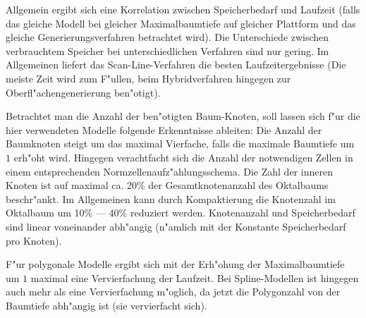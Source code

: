 Allgemein ergibt sich eine Korrelation zwischen Speicherbedarf und Laufzeit 
(falls das gleiche Modell bei gleicher Maximalbaumtiefe auf gleicher 
Plattform und das gleiche Generierungsverfahren betrachtet wird).
Die Unterschiede zwischen verbrauchtem Speicher bei unterschiedlichen 
Verfahren sind nur gering.
Im Allgemeinen liefert das Scan-Line-Verfahren die besten Laufzeitergebnisse 
(Die meiste Zeit wird zum F"ullen, beim Hybridverfahren hingegen zur 
Oberfl"achengenerierung ben"otigt).

Betrachtet man die Anzahl der ben"otigten Baum-Knoten, soll lassen sich 
f"ur die hier verwendeten Modelle folgende Erkenntnisse ableiten: 
Die Anzahl der Baumknoten steigt um das maximal Vierfache, falls die 
maximale Baumtiefe um $1$ erh"oht wird. Hingegen verachtfacht sich 
die Anzahl der notwendigen Zellen in einem entsprechenden 
Normzellenaufz"ahlungsschema. Die Zahl der inneren Knoten ist auf maximal 
ca. 20\% der Gesamtknotenanzahl des Oktalbaums beschr"ankt. 
Im Allgemeinen kann durch Kompaktierung die Knotenzahl im Oktalbaum um 
10\% --- 40\% reduziert werden.
Knotenanzahl und Speicherbedarf sind linear voneinander abh"angig 
(n"amlich mit der Konstante Speicherbedarf pro Knoten).

F"ur polygonale Modelle ergibt sich mit der Erh"ohung der Maximalbaumtiefe um 
$1$ maximal eine Vervierfachung der Laufzeit.
Bei Spline-Modellen ist hingegen auch mehr als eine Vervierfachung m"oglich, 
da jetzt die Polygonzahl von der Baumtiefe abh"angig ist (sie vervierfacht 
sich).



